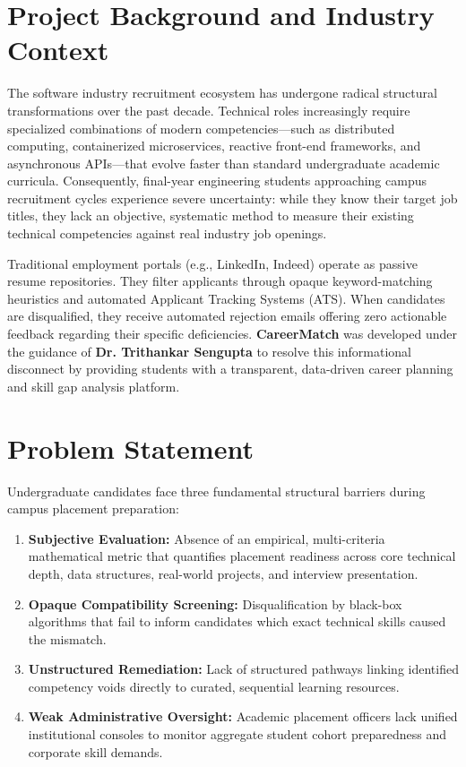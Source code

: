 \documentclass[11pt,a4paper]{report}
\begin{document}
\section{Project Background and Industry Context}
The software industry recruitment ecosystem has undergone radical structural transformations over the past decade. Technical roles increasingly require specialized combinations of modern competencies—such as distributed computing, containerized microservices, reactive front-end frameworks, and asynchronous APIs—that evolve faster than standard undergraduate academic curricula. Consequently, final-year engineering students approaching campus recruitment cycles experience severe uncertainty: while they know their target job titles, they lack an objective, systematic method to measure their existing technical competencies against real industry job openings.

Traditional employment portals (e.g., LinkedIn, Indeed) operate as passive resume repositories. They filter applicants through opaque keyword-matching heuristics and automated Applicant Tracking Systems (ATS). When candidates are disqualified, they receive automated rejection emails offering zero actionable feedback regarding their specific deficiencies. \textbf{CareerMatch} was developed under the guidance of \textbf{Dr. Trithankar Sengupta} to resolve this informational disconnect by providing students with a transparent, data-driven career planning and skill gap analysis platform.

\section{Problem Statement}
Undergraduate candidates face three fundamental structural barriers during campus placement preparation:
\begin{enumerate}
    \item \textbf{Subjective Evaluation:} Absence of an empirical, multi-criteria mathematical metric that quantifies placement readiness across core technical depth, data structures, real-world projects, and interview presentation.
    \item \textbf{Opaque Compatibility Screening:} Disqualification by black-box algorithms that fail to inform candidates which exact technical skills caused the mismatch.
    \item \textbf{Unstructured Remediation:} Lack of structured pathways linking identified competency voids directly to curated, sequential learning resources.
    \item \textbf{Weak Administrative Oversight:} Academic placement officers lack unified institutional consoles to monitor aggregate student cohort preparedness and corporate skill demands.
\end{enumerate}
\end{document}
